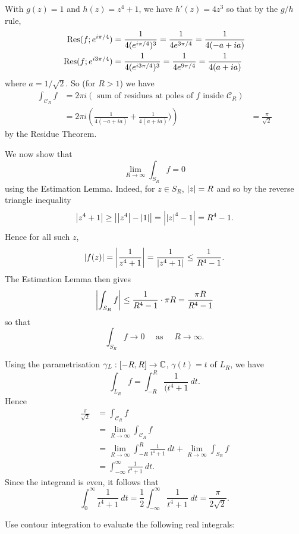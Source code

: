 \begin{questions}
\begin{answer}
\begin{parts}
With $g(z)=1$ and $h(z)=z^4+1$, we have $h'(z)=4z^3$ so that by the $g/h$ rule,
\begin{align*}
\mathrm{Res}(f;e^{i\pi/4}) &= \frac{1}{4(e^{i\pi/4})^3} = \frac{1}{4e^{3\pi/4}} = \frac{1}{4(-a+ia)} \\
\mathrm{Res}(f;e^{i3\pi/4}) &= \frac{1}{4(e^{i3\pi/4})^3} = \frac{1}{4e^{9\pi/4}} = \frac{1}{4(a+ia)} \\
\end{align*}
where $a=1/\sqrt{2}$. So (for $R>1$) we have
\begin{align*}
\int_{\mathcal{C}_R} f &= 2\pi i \left( \text{ sum of residues at poles of $f$ inside $\mathcal{C}_R$} \right) \\
& = 2\pi i \left( \frac{1}{4(-a+ia)}+\frac{1}{4(a+ia)}) \right)
& = \frac{\pi}{\sqrt{2}}
\end{align*}
by the Residue Theorem.

We now show that 
\[
\lim_{R \to \infty} \int_{S_R} f =0
\]
using the Estimation Lemma.  Indeed, for $z \in S_R$, $\left| z \right|=R$ and so by the reverse triangle inequality
\[
\left| z^4+1 \right| \geq \left|  \left| z^4 \right| - \left| 1 \right|  \right| = \left|  \left| z \right|^4-1  \right| = R^4-1.
\]
Hence for all such $z$,
\[
\left|  f(z)  \right| = \left| \frac{1}{z^4+1} \right| = \frac{1}{\left| z^4+1 \right|} \leq \frac{1}{R^4-1}.
\]
The Estimation Lemma then gives
\[
\left|  \int_{S_R} f  \right| \leq \frac{1}{R^4-1} \cdot \pi R = \frac{\pi R}{R^4-1}
\]
so that
\[
\int_{S_R} f \to 0 \quad\text{ as }\quad R \to \infty.
\]

Using the parametrisation $\gamma_L:[-R,R] \to \mathbb{C}$, $\gamma(t)=t$ of $L_R$, we have
\[
\int_{L_R} f = \int_{-R}^R \frac{1}{(t^4+1}\ dt.
\]
Hence
\begin{align*}
\frac{\pi}{\sqrt{2}} & = \int_{\mathcal{C}_R} f \\
& = \lim_{R \to \infty} \int_{\mathcal{C}_R} f \\
& = \lim_{R \to \infty} \int_{-R}^R \frac{1}{t^4+1}\ dt + \lim_{R \to \infty} \int_{S_R} f \\
& = \int_{-\infty}^{\infty} \frac{1}{t^4+1}\ dt.
\end{align*}
Since the integrand is even, it follows that
\[
\int_{0}^{\infty} \frac{1}{t^4+1}\ dt = \frac{1}{2} \int_{-\infty}^{\infty} \frac{1}{t^4+1}\ dt = \frac{\pi}{2\sqrt{2}}.
\]

\end{parts}
\end{answer}
\question Use contour integration to evaluate the following real integrals:
\begin{parts}

\end{parts}
\end{questions}
